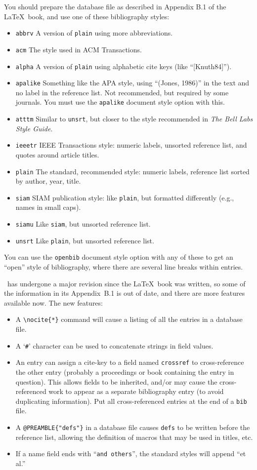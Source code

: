 You should prepare the database file as described in Appendix B.1
of the \LaTeX\ book, and use one of these bibliography styles:
\begin{itemize}
\item[] \hbox{\tt abbrv}
A version of \verb|plain| using more abbreviations.
\item[] \hbox{\tt acm}
The style used in ACM Transactions.
\item[] \hbox{\tt alpha}
A version of \verb|plain| using alphabetic cite keys
(like ``[Knuth84]'').
\item[] \hbox{\tt apalike}
Something like the APA style,
using ``(Jones, 1986)'' in the text and no label in the reference list.
Not recommended, but required by some journals.
You must use the \verb|apalike| document style option with this.
\item[] \hbox{\tt atttm}
Similar to {\tt unsrt}, but closer to the style
recommended in {\it The Bell Labs Style Guide}.
\item[] \hbox{\tt ieeetr}
IEEE Transactions style: numeric labels, unsorted reference list,
and quotes around article titles.
\item[] \hbox{\tt plain}
The standard, recommended style: numeric labels, reference list
sorted by author, year, title.
\item[] \hbox{\tt siam}
SIAM publication style: like \verb|plain|, but formatted differently
(e.g., names in small caps).
\item[] \hbox{\tt siamu}
Like \verb|siam|, but unsorted reference list.
\item[] \hbox{\tt unsrt}
Like \verb|plain|, but unsorted reference list.
\end{itemize}
You can use the \verb|openbib| document style option with any of
these to get an ``open'' style of bibliography, where there are
several line breaks within entries.

\BibTeX\ has undergone a major revision since the \LaTeX\ book
was written, so some of the information in its Appendix~B.1
is out of date, and there are more features available now.
The new features:
\begin{itemize}
\item
A \verb|\nocite{*}| command will cause a listing of all the entries
in a database file.
\item
A `\verb|#|' character can be used to concatenate strings
in field values.
\item
An entry can assign a cite-key to a field named \verb|crossref|
to cross-reference the other entry (probably a proceedings or
book containing the entry in question).
This allows fields to be inherited, and/or may cause the cross-referenced
work to appear as a separate bibliography entry (to avoid duplicating
information).
Put all cross-referenced entries at the end of a \verb|bib| file.
\item
A \verb|@PREAMBLE{"defs"}| in a database file causes
\verb|defs| to be written before the reference list,
allowing the definition of macros that may be used in titles, etc.
\item
If a name field ends with ``{\tt and others}'', the standard styles
will append ``et al.''
\end{itemize}

